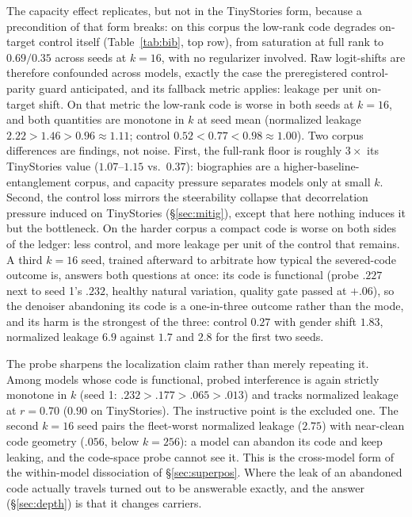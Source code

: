 \documentclass[11pt]{article}
\begin{document}
The capacity effect replicates, but not in the TinyStories form, because a
precondition of that form breaks: on this corpus the low-rank code degrades
on-target control itself (Table~\ref{tab:bib}, top row), from saturation at
full rank to $0.69/0.35$ across seeds at $k{=}16$, with no regularizer
involved. Raw logit-shifts are therefore confounded across models, exactly the
case the preregistered control-parity guard anticipated, and its fallback
metric applies: leakage per unit on-target shift. On that metric the low-rank
code is worse in both seeds at $k{=}16$, and both quantities are monotone in
$k$ at seed mean (normalized leakage $2.22 > 1.46 > 0.96 \approx 1.11$;
control $0.52 < 0.77 < 0.98 \approx 1.00$). Two corpus differences are
findings, not noise. First, the full-rank floor is roughly $3\times$ its
TinyStories value ($1.07$--$1.15$ vs.\ $0.37$): biographies are a
higher-baseline-entanglement corpus, and capacity pressure separates models
only at small $k$. Second, the control loss mirrors the steerability collapse
that decorrelation pressure induced on TinyStories (\S\ref{sec:mitig}), except
that here nothing induces it but the bottleneck. On the harder corpus a
compact code is worse on both sides of the ledger: less control, and more
leakage per unit of the control that remains. A third $k{=}16$ seed,
trained afterward to arbitrate how typical the severed-code outcome is,
answers both questions at once: its code is functional (probe $.227$
next to seed 1's $.232$, healthy natural variation, quality gate passed
at $+.06$), so the denoiser abandoning its code is a one-in-three
outcome rather than the mode, and its harm is the strongest of the
three: control $0.27$ with gender shift $1.83$, normalized leakage
$6.9$ against $1.7$ and $2.8$ for the first two seeds.

The probe sharpens the localization claim rather than merely repeating it.
Among models whose code is functional, probed interference is again strictly
monotone in $k$ (seed 1: $.232 > .177 > .065 > .013$) and tracks normalized
leakage at $r{=}0.70$ ($0.90$ on TinyStories). The instructive point is the
excluded one. The second $k{=}16$ seed pairs the fleet-worst normalized
leakage ($2.75$) with near-clean code geometry ($.056$, below $k{=}256$): a
model can abandon its code and keep leaking, and the code-space probe cannot
see it. This is the cross-model form of the within-model dissociation of
\S\ref{sec:superpos}. Where the leak of an abandoned code actually travels
turned out to be answerable exactly, and the answer (\S\ref{sec:depth}) is
that it changes carriers.
\end{document}
